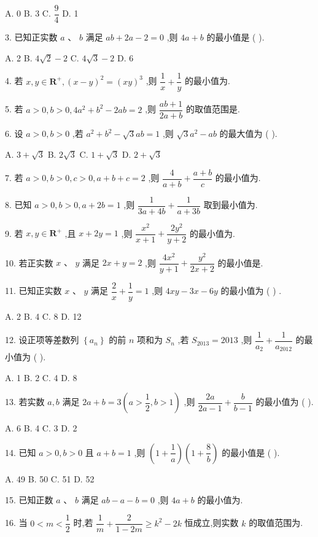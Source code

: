 A. 0 B. 3 C. $\dfrac{9}{4}$ D. 1

3. 已知正实数 $a$ 、 $b$ 满足 ${ab} + {2a} - 2 = 0$ ,则 ${4a} + b$ 的最小值是 (   ).

A. 2 B. $4\sqrt{2} - 2$ C. $4\sqrt{3} - 2$ D. 6

4. 若 $x,y \in  {\mathbf{R}}^{ + },{\left( x - y\right) }^{2} = {\left( xy\right) }^{3}$ ,则 $\dfrac{1}{x} + \dfrac{1}{y}$ 的最小值为\blkda{}.

5. 若 $a > 0,b > 0,4{a}^{2} + {b}^{2} - {2ab} = 2$ ,则 $\dfrac{{ab} + 1}{{2a} + b}$ 的取值范围是\blkda{}.

6. 设 $a > 0,b > 0$ ,若 ${a}^{2} + {b}^{2} - \sqrt{3}{ab} = 1$ ,则 $\sqrt{3}{a}^{2} - {ab}$ 的最大值为 (   ).

A. $3 + \sqrt{3}$ B. $2\sqrt{3}$ C. $1 + \sqrt{3}$ D. $2 + \sqrt{3}$

7. 若 $a > 0,b > 0,c > 0,a + b + c = 2$ ,则 $\dfrac{4}{a + b} + \dfrac{a + b}{c}$ 的最小值为\blkda{}.

8. 已知 $a > 0,b > 0,a + {2b} = 1$ ,则 $\dfrac{1}{{3a} + {4b}} + \dfrac{1}{a + {3b}}$ 取到最小值为\blkda{}.

9. 若 $x,y \in  {\mathbf{R}}^{ + }$ ,且 $x + {2y} = 1$ ,则 $\dfrac{{x}^{2}}{x + 1} + \dfrac{2{y}^{2}}{y + 2}$ 的最小值为\blkda{}.

10. 若正实数 $x\text{ 、 }y$ 满足 ${2x} + y = 2$ ,则 $\dfrac{4{x}^{2}}{y + 1} + \dfrac{{y}^{2}}{{2x} + 2}$ 的最小值是\blkda{}.

11. 已知正实数 $x\text{ 、 }y$ 满足 $\dfrac{2}{x} + \dfrac{1}{y} = 1$ ,则 ${4xy} - {3x} - {6y}$ 的最小值为 (   ) .

A. 2 B. 4 C. 8 D. 12

12. 设正项等差数列 $\left\{  {a}_{n}\right\}$ 的前 $n$ 项和为 ${S}_{n}$ ,若 ${S}_{2013} = {2013}$ ,则 $\dfrac{1}{{a}_{2}} + \dfrac{1}{{a}_{2012}}$ 的最小值为 (   ).

A. 1 B. 2 C. 4 D. 8

13. 若实数 $a,b$ 满足 ${2a} + b = 3\left( {a > \dfrac{1}{2},b > 1}\right)$ ,则 $\dfrac{2a}{{2a} - 1} + \dfrac{b}{b - 1}$ 的最小值为 (   ).

A. 6 B. 4 C. 3 D. 2

14. 已知 $a > 0,b > 0$ 且 $a + b = 1$ ,则 $\left( {1 + \dfrac{1}{a}}\right) \left( {1 + \dfrac{8}{b}}\right)$ 的最小值是 (   ).

A. 49 B. 50 C. 51 D. 52

15. 已知正数 $a$ 、 $b$ 满足 ${ab} - a - b = 0$ ,则 ${4a} + b$ 的最小值为\blkda{}.

16. 当 $0 < m < \dfrac{1}{2}$ 时,若 $\dfrac{1}{m} + \dfrac{2}{1 - {2m}} \geq  {k}^{2} - {2k}$ 恒成立,则实数 $k$ 的取值范围为\blkda{}.

